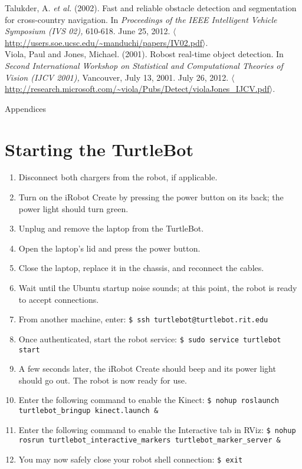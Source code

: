 \documentclass[12pt]{report}
\renewcommand{\Large}{\fontsize{18pt}{18pt}\selectfont}
\begin{document}
\label{bib:talukder}
Talukder, A. \textit{et al.} (2002). Fast and reliable obstacle detection and segmentation for cross-country navigation. In \textit{Proceedings of the IEEE Intelligent Vehicle Symposium (IVS 02),} 610-618. June 25, 2012. $\langle$\url{http://users.soe.ucsc.edu/~manduchi/papers/IV02.pdf}$\rangle$. \\
\label{bib:viola}
Viola, Paul and Jones, Michael. (2001). Robost real-time object detection. In \textit{Second International Workshop on Statistical and Computational Theories of Vision (IJCV 2001),} Vancouver, July 13, 2001. July 26, 2012. $\langle$\url{http://research.microsoft.com/~viola/Pubs/Detect/violaJones_IJCV.pdf}$\rangle$.

\clearpage
{\Large Appendices} \\
\appendix
\section{Starting the TurtleBot}
\begin{sloppypar}
\begin{enumerate}
\item{Disconnect both chargers from the robot, if applicable.}
\item{Turn on the iRobot Create by pressing the power button on its back; the power light should turn green.}
\item{Unplug and remove the laptop from the TurtleBot.}
\item{Open the laptop's lid and press the power button.}
\item{Close the laptop, replace it in the chassis, and reconnect the cables.}
\item{Wait until the Ubuntu startup noise sounds; at this point, the robot is ready to accept connections.}
\item{From another machine, enter: \texttt{\$\ ssh turtlebot@turtlebot.rit.edu}}
\item{Once authenticated, start the robot service: \texttt{\$\ sudo service turtlebot start}}
\item{A few seconds later, the iRobot Create should beep and its power light should go out.  The robot is now ready for use.}
\item{Enter the following command to enable the Kinect: \texttt{\$\ nohup roslaunch turtlebot\_bringup kinect.launch \&}}
\item{Enter the following command to enable the Interactive tab in RViz: \texttt{\$\ nohup rosrun turtlebot\_interactive\_markers turtlebot\_marker\_server \&}}
\item{You may now safely close your robot shell connection: \texttt{\$\ exit}}
\end{enumerate}
\end{sloppypar}
\end{document}
